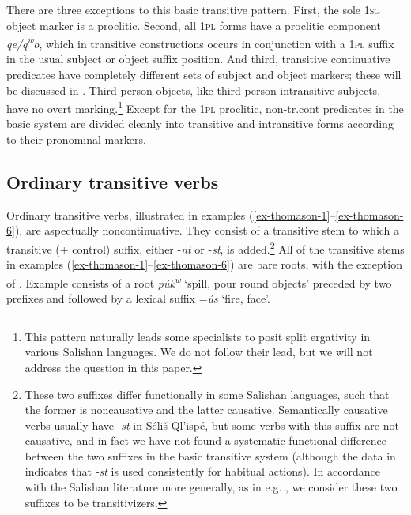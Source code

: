 \documentclass[output=paper,colorlinks,citecolor=brown]{langscibook}
\begin{document}
There are three exceptions to this basic transitive pattern.  First,
the sole \textsc{1sg} object marker is a proclitic.  Second, all \textsc{1pl} forms have
a proclitic component \emph{qe/{q\textsuperscript w}o}, which in
transitive constructions occurs in conjunction with a \textsc{1pl} suffix in the
usual subject or object suffix position.  And third, transitive
continuative predicates have completely different sets of subject and
object markers; these will be discussed in .  Third-person
objects, like third-person intransitive subjects, have no overt
marking.\footnote{This pattern naturally leads some specialists to
posit split ergativity in various Salishan languages.  We do not
follow their lead, but we will not address the question in this
paper.}  Except for the \textsc{1pl} proclitic, non-tr.cont predicates in
the basic system are divided cleanly into transitive and intransitive
forms according to their pronominal markers.

\subsection{Ordinary transitive verbs}  %
\label{thomason_section_2.1}

  Ordinary transitive verbs, illustrated in examples (\ref{ex-thomason-1}--\ref{ex-thomason-6}), are aspectually
  noncontinuative.  They consist of a transitive stem to which a
  transitive (+ control) suffix, either -\emph{nt} or -\emph{st}, is
  added.\footnote{These two suffixes differ functionally in some
  Salishan languages, such that the former is noncausative and the
  latter causative.  Semantically causative verbs usually have
  -\emph{st} in S\'eli\v{s}-Ql'isp\'e, but some verbs with this
  suffix are not causative, and in fact we have not found a
  systematic functional difference between the two suffixes in the
  basic transitive system (although the data in
   indicates that \emph{-st} is used
  consistently for habitual actions). In accordance with the Salishan
  literature more generally, as in
  e.g. , we consider these
  two suffixes to be transitivizers.}  All of the transitive stems in
  examples (\ref{ex-thomason-1}--\ref{ex-thomason-6}) are bare roots, with the exception of .  Example  consists
  of a root \emph{p\'uk\textsuperscript w} `spill, pour round
  objects' preceded by two prefixes and followed by a lexical suffix
  =\emph{\'us} `fire, face'.
\end{document}
